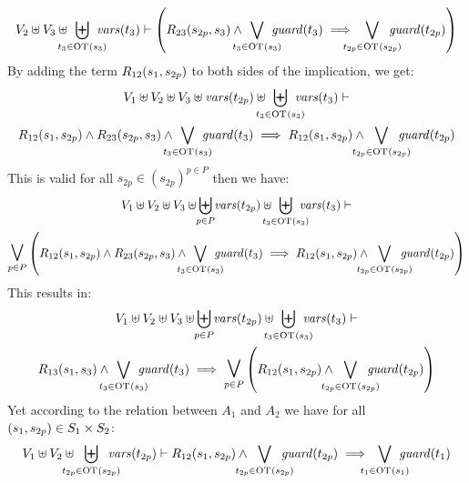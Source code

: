 \documentclass[runningheads]{llncs}
\begin{document}
\begin{enumerate}
\begin{multline*}
 V_2 \uplus V_3 \uplus \biguplus_\subbox{t_3 \in \fOT{s_3}} \fvars{t_3} \vdash \left(R_{23}\mpar{s_{2p}, s_3} \wedge \bigvee_\subbox{t_3 \in \fOT{s_3}} \fguard{t_3} \implies \bigvee_\subbox{t_{2p} \in \fOT{s_{2p}}} \fguard{t_{2p}} \right)
\end{multline*}
By adding the term $R_{12}{\left(s_1,s_{2p}\right)}$ to both sides of the implication, we get:
\begin{multline*}
V_1 \uplus V_2 \uplus V_3 \uplus \fvars{t_{2p}} \uplus \biguplus_\subbox{t_3 \in \fOT{s_3}} \fvars{t_3} \vdash \\
R_{12}\mpar{s_1,s_{2p}}\wedge R_{23}\mpar{s_{2p}, s_3} \wedge \bigvee_\subbox{t_3 \in \fOT{s_3}} \fguard{t_3} \implies R_{12}\mpar{s_1,s_{2p}}\wedge \bigvee_\subbox{t_{2p} \in \fOT{s_{2p}}} \fguard{t_{2p}} 
\end{multline*}
This is valid for all $s_{2p} \in (s_{2p})^{p\in P}$ then we have:
\begin{multline*}
V_1 \uplus V_2 \uplus V_3 \uplus \biguplus_\subbox{p \in P} \fvars{t_{2p}} \uplus \biguplus_\subbox{t_3 \in \fOT{s_3}} \fvars{t_3} \vdash \\
\operatorname*{\bigsymb{\bigvee}}_{p\in P}\mpar{
R_{12}\mpar{s_1,s_{2p}}\wedge R_{23}\mpar{s_{2p}, s_3} \wedge \bigvee_\subbox{t_3 \in \fOT{s_3}} \fguard{t_3} \implies R_{12}\mpar{s_1,s_{2p}}\wedge \bigvee_\subbox{t_{2p} \in \fOT{s_{2p}}} \fguard{t_{2p}}} 
\end{multline*}
This results in:
\begin{multline*}
V_1 \uplus V_2 \uplus V_3 \uplus\biguplus_\subbox{p \in P} \fvars{t_{2p}} \uplus \biguplus_\subbox{t_3 \in \fOT{s_3}} \fvars{t_3} \vdash \\
R_{13}\mpar{s_1,s_3} \wedge \bigvee_\subbox{t_3 \in \fOT{s_3}} \fguard{t_3} \implies \operatorname*{\bigsymb{\bigvee}}_{p\in P}\mpar{ R_{12}\mpar{s_1,s_{2p}}\wedge \bigvee_\subbox{t_{2p} \in \fOT{s_{2p}}} \fguard{t_{2p}}} 
\end{multline*}
Yet according to the relation between $A_1$ and $A_2$ we have  for all ${\left(s_1, s_{2p}\right)} \in S_1 \times S_2$:
\begin{multline*}
 V_1 \uplus V_2 \uplus \biguplus_\subbox{t_{2p} \in \fOT{s_{2p}}} \fvars{t_{2p}} \vdash R_{12}\mpar{s_1, s_{2p}} \wedge \bigvee_\subbox{t_{2p} \in \fOT{s_{2p}}} \fguard{t_{2p}} \implies \bigvee_\subbox{t_1 \in \fOT{s_1}} \fguard{t_1} 
\end{multline*}




\end{enumerate}
\end{document}
